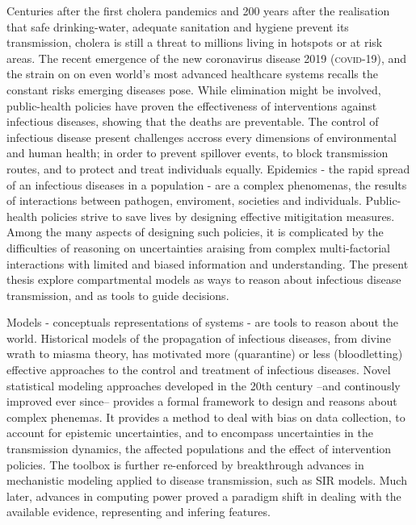  Centuries after the first cholera pandemics and 200 years after the realisation that safe drinking-water, adequate sanitation and hygiene prevent its transmission, cholera is still a threat to millions living in hotspots or at risk areas. The recent emergence of the new coronavirus disease 2019 (\textsc{covid}-19), and the strain on on even world's most advanced healthcare systems recalls the constant risks emerging diseases pose.%
While elimination might be involved, public-health policies have proven the effectiveness of interventions against infectious diseases, showing that the deaths are preventable. The control of infectious disease present challenges accross every dimensions of environmental and human health; in order to prevent spillover events, to block transmission routes, and to protect and treat individuals equally. Epidemics - the rapid spread of an infectious diseases in a population -  are a complex phenomenas, the results of interactions between pathogen, enviroment, societies and individuals\cite{Buckee:ThinkingClearlySocial:2021, Heesterbeek:ModelingInfectiousDisease:2015,Rinaldo:RiverNetworksEcological:2020a}. Public-health policies strive to save lives by designing effective mitigitation measures. Among the many aspects of designing such policies, it is complicated by the difficulties of reasoning on uncertainties araising from complex multi-factorial interactions with limited and biased information and understanding. The present thesis explore compartmental models as ways to reason about infectious disease transmission, and as tools to guide decisions. 

Models - conceptuals representations of systems - are tools to reason about the world. Historical models of the propagation of infectious diseases, from divine wrath to miasma theory, has motivated more (quarantine) or less (bloodletting) effective approaches to the control and treatment of infectious diseases.
Novel statistical modeling approaches\cite{Freedman:AssociationCausationRemarks:1999} developed in the 20th century --and continously improved ever since\cite{Gelman:WhatAreMost:2021}--  provides a formal framework to design and reasons about complex phenemas. It provides a method to deal with bias on data collection, to account for epistemic uncertainties, and to encompass uncertainties in the transmission dynamics, the affected populations and the effect of intervention policies. The toolbox is further re-enforced by breakthrough advances in mechanistic modeling applied to disease transmission, such as SIR models\cite{Kermack:ContributionMathematicalTheory:1927, Anderson:PopulationBiologyInfectious:1979}. Much later, advances in computing power proved a paradigm shift in dealing with the available evidence, representing and infering features. 

